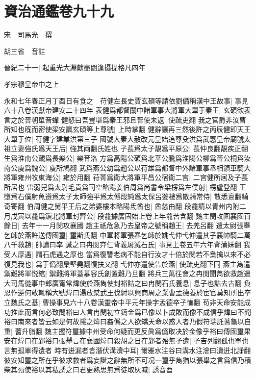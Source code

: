 \chapter{資治通鑑卷九十九}
宋　司馬光　撰

胡三省　音註

晉紀二十一|{
	起重光大淵獻盡閼逢攝提格凡四年}


孝宗穆皇帝中之上

永和七年春正月丁酉日有食之　苻健左長史賈玄碩等請依劉備稱漢中王故事|{
	事見六十八卷漢獻帝建安二十四年}
表健爲都督關中諸軍事大將軍大單于秦王|{
	玄碩欲表言之於晉朝單音蟬}
健怒曰吾豈堪爲秦王邪且晉使未返|{
	使疏吏翻}
我之官爵非汝曹所知也旣而密使梁安諷玄碩等上尊號|{
	上時掌翻}
健辭讓再三然後許之丙辰健即天王大單于位|{
	苻健字建業洪第三子}
國號大秦大赦改元皇始追尊殳洪爲武惠皇帝廟號太祖立妻強氏爲天王后|{
	強其兩翻氏姓也}
子萇爲太子靚爲平原公|{
	萇仲良翻靚疾正翻}
生爲淮南公覿爲長樂公|{
	樂音洛}
方爲高陽公碩爲北平公騰爲淮陽公柳爲晉公桐爲汝南公廋爲魏公|{
	廋所鳩翻}
武爲燕公幼爲趙公以苻雄爲都督中外諸軍事丞相領車騎大將軍雍州牧東海公|{
	雍於用翻}
苻菁爲衛大將軍平昌公宿衛二宫|{
	二宫健所居及子萇所居也}
雷弱兒爲太尉毛貴爲司空略陽姜伯周爲尚書令梁楞爲左僕射|{
	楞盧登翻}
王墮爲右僕射魚遵爲太子太師強平爲太傅段純爲太保呂婆樓爲散騎常侍|{
	散悉亶翻騎奇寄翻}
伯周健之舅平王后之弟婆樓本略陽氐酋也|{
	酋慈由翻}
段龕請以青州内附二月戊寅以龕爲鎭北將軍封齊公|{
	段龕據廣固始上卷上年龕苦含翻}
魏主閔攻圍襄國百餘日|{
	去年十一月閔攻襄國}
趙主祇危急乃去皇帝之號稱趙王|{
	去羌呂翻}
遣太尉張舉乞師於燕許送傳國璽|{
	璽斯氏翻}
中軍將軍張春乞師於姚弋仲弋仲遣其子襄帥騎二萬八千救趙|{
	帥讀曰率}
誡之曰冉閔弃仁背義屠滅石氏|{
	事見上卷五年六年背蒲妹翻}
我受人厚遇|{
	謂石虎遇之厚也}
當爲復讐老病不能自行汝才十倍於閔若不梟擒以來不必復見我也|{
	爲于僞翻梟堅堯翻復扶又翻}
弋仲亦遣使告於燕|{
	使疏吏翻下同}
燕主雋遣禦難將軍悦綰|{
	禦難將軍蓋慕容氏創置難乃旦翻}
將兵三萬往會之冉閔聞雋欲救趙遣大司馬從事中郎廣甯常煒使於燕雋使封裕詰之曰冉閔石氏養息|{
	息子也詰去吉翻}
負恩作逆何敢輒稱大號煒曰湯放桀武王伐紂以興商周之業曹孟德養於宦官莫知所出卒立魏氏之基|{
	曹操事見六十八卷漢靈帝中平元年操字孟德卒子恤翻}
苟非天命安能成功推此而言何必致問裕曰人言冉閔初立鑄金爲已像以卜成敗而像不成信乎煒曰不聞裕曰南來者皆云如是何故隱之煒曰姦僞之人欲矯天命以惑人者乃假符瑞託蓍龜以自重|{
	蓍升脂翻}
魏主握符璽據中州受命何疑而更反眞爲僞取决於金像乎裕曰傳國璽果安在煒曰在鄴裕曰張舉言在襄國煒曰殺胡之日在鄴者殆無孑遺|{
	孑吉列翻孤也單也言無孤單得遺者}
時有迸漏者皆潛伏溝瀆中耳|{
	爾雅水注谷曰溝水注澮曰瀆迸北諍翻}
彼安知璽之所在乎彼求救者爲妄誕之辭無所不可况一璽乎雋猶以張舉之言爲信乃積柴其㫄使裕以其私誘之曰君更熟思無爲徒取灰㓕|{
	誘音酉}
